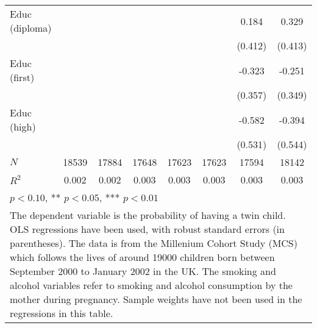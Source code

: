 \begin{table}[h!]
{\begin{tabular}{l*{7}{c}}
Educ (diploma) &               &               &               &               &               &       0.184   &       0.329   \\
            &               &               &               &               &               &     (0.412)   &     (0.413)   \\

Educ (first)  &               &               &               &               &               &      -0.323   &      -0.251   \\
            &               &               &               &               &               &     (0.357)   &     (0.349)   \\

Educ (high)   &               &               &               &               &               &      -0.582   &      -0.394   \\
            &               &               &               &               &               &     (0.531)   &     (0.544)   \\

\hline
\(N\)       &       18539   &       17884   &       17648   &       17623   &       17623   &       17594   &       18142   \\
\(R^{2}\)   &       0.002   &       0.002   &       0.003   &       0.003   &       0.003   &       0.003   &       0.003   \\
\hline\hline
\multicolumn{8}{l}{\footnotesize * \(p<0.10\), ** \(p<0.05\), *** \(p<0.01\)}\\
\multicolumn{8}{p{13.5cm}}{\footnotesize The dependent variable is the probability of having a twin child. OLS regressions have been used, with robust standard errors (in parentheses). The data is from the Millenium Cohort Study (MCS) which follows the lives of around 19000 children born between September 2000 to January 2002 in the UK. The smoking and alcohol variables refer to smoking and alcohol consumption by the mother during pregnancy. Sample weights have not been used in the regressions in this table.}\\
\end{tabular}}
\end{table}

